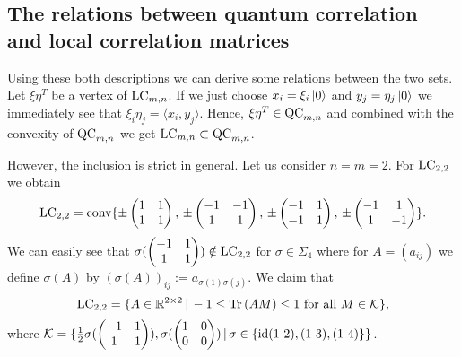 \subsection{The relations between quantum correlation and local correlation matrices}

Using these both descriptions we can derive some relations between the two sets. 
Let $ \xi\eta^T $ be a vertex of $ \textup{LC}_{m,n} $. If we just choose $ x_i = \xi_i \ket{0}$ and $ y_j = \eta_j\ket{0} $ we immediately see that $ \xi_i\eta_j = \langle x_i, y_j \rangle $. Hence, $ \xi\eta^T \in \textup{QC}_{m,n} $ and combined with the convexity of $ \textup{QC}_{m,n} $ we get $ \textup{LC}_{m,n} \subset \textup{QC}_{m,n} $.

However, the inclusion is strict in general. Let us consider $ n=m=2 $. 
For $ \textup{LC}_{2,2} $ we obtain 
\begin{align*}
	\textup{LC}_{2,2}= \textup{conv} \{ \pm \begin{pmatrix}
	1 & 1 \\
	1 & 1
	\end{pmatrix} , \, \pm \begin{pmatrix}
	-1 & -1 \\
	1 & 1
	\end{pmatrix} , \, \pm \begin{pmatrix}
	-1 & 1 \\
	-1 & 1
	\end{pmatrix}, \, \pm \begin{pmatrix}
	-1 & 1 \\
	1 & -1
	\end{pmatrix}  \}.
\end{align*}
We can easily see that $ \sigma(\begin{pmatrix}
-1 & 1 \\ 1 & 1 
\end{pmatrix}) \notin \textup{LC}_{2,2} $ for $ \sigma \in \Sigma_4 $ where for $ A = (a_{ij}) $ we define $ \sigma (A)  $ by $ (\sigma( A))_{ij}:= a_{\sigma(1)\sigma(j)} $.
We claim that
\begin{equation}\label{facetsLC}
	\textup{LC}_{2,2} = \{ A \in \mathbb{R}^{2 \times 2} \, | \, -1 \le  \text{Tr} \, {(AM)}  \le 1 \textup{ for all } M \in \mathcal{K} \},
\end{equation}
where $ \mathcal{K}  = \{ \frac{1}{2}\sigma(\begin{pmatrix}
-1 & 1 \\
1 & 1
\end{pmatrix}), \sigma(\begin{pmatrix}
1 & 0 \\
0 & 0
\end{pmatrix}) \, | \,  \sigma \in \{ \textup{id} (1 \, \, 2), (1 \, \, 3), (1 \, \, 4) \} \} $.
